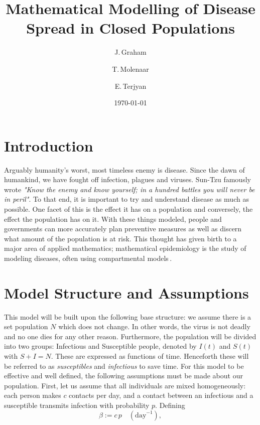 \documentclass[11pt]{article}
\title{Mathematical Modelling of Disease Spread in Closed Populations}
\author{J.\,Graham \and T.\,Molenaar \and E.\,Terjyan}
\date{\today}
\begin{document}
\maketitle


\section{Introduction}
Arguably humanity's worst, most timeless enemy is disease. Since the dawn of humankind, we have fought off infection, plagues and viruses. Sun-Tzu famously wrote \textit{"Know the enemy and know yourself; in a hundred battles you will never be in peril"}. To that end, it is important to try and understand disease as much as possible. One facet of this is the effect it has on a population and conversely, the effect the population has on it. With these things modeled, people and governments can more accurately plan preventive measures as well as discern what amount of the population is at risk. This thought has given birth to a major area of applied mathematics; mathematical epidemiology is the study of modeling diseases, often using compartmental models\,\citep{Kermack1927,Greer2018}.

\section{Model Structure and Assumptions}\label{sec:General}
This model will be built upon the following base structure: we assume there is a set population $N$ which does not change. In other words, the virus is not deadly and no one dies for any other reason. Furthermore, the population will be divided into two groups: Infectious and Susceptible people, denoted by $I(t)$ and $S(t)$ with $S+I=N$. These are expressed as functions of time. Henceforth these will be referred to as \emph{susceptibles} and \emph{infectious} to save time. For this model to be effective and well defined, the following assumptions must be made about our population. First, let us assume that all individuals are mixed homogeneously: each person makes $c$ contacts per day, and a contact between an infectious and a susceptible transmits infection with probability $p$. Defining 
\begin{equation*}
    \beta := c\,p \quad (\text{day}^{-1}),
\end{equation*}
\end{document}

